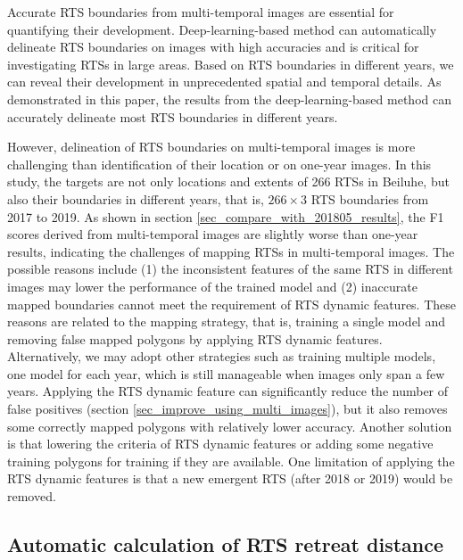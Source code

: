\documentclass[authoryear,preprint,review,12pt]{elsarticle}
\begin{document}
Accurate RTS boundaries from multi-temporal images are essential for quantifying their development.
Deep-learning-based method can automatically delineate RTS boundaries on images with high accuracies and is critical for investigating RTSs in large areas. 
Based on RTS boundaries in different years, we can reveal their development in unprecedented spatial and temporal details. 
As demonstrated in this paper, the results from the deep-learning-based method can accurately delineate most RTS boundaries in different years. %


However, delineation of RTS boundaries on multi-temporal images is more challenging than identification of their location or on one-year images. 
In this study, the targets are not only locations and extents of 266 RTSs in Beiluhe, but also their boundaries in different years, that is, $266\times3$ RTS boundaries from 2017 to 2019.
As shown in section \ref{sec_compare_with_201805_results}, the F1 scores derived from multi-temporal images are slightly worse than one-year results, indicating the challenges of mapping RTSs in multi-temporal images. 
The possible reasons include (1) the inconsistent features of the same RTS in different images may lower the performance of the trained model 
and (2) inaccurate mapped boundaries cannot meet the requirement of RTS dynamic features. 
These reasons are related to the mapping strategy, that is, training a single model and removing false mapped polygons by applying RTS dynamic features.  
Alternatively, we may adopt other strategies such as training multiple models, one model for each year,  which is still manageable when images only span a few years.
Applying the RTS dynamic feature can significantly reduce the number of false positives (section \ref{sec_improve_using_multi_images}), but it also removes some correctly mapped polygons with relatively lower accuracy. 
Another solution is that lowering the criteria of RTS dynamic features or adding some negative training polygons for training if they are available.
One limitation of applying the RTS dynamic features is that a new emergent RTS (after 2018 or 2019) would be removed. 



\subsection{Automatic calculation of RTS retreat distance}
\label{sec_diss_retreat_distance}
\end{document}

